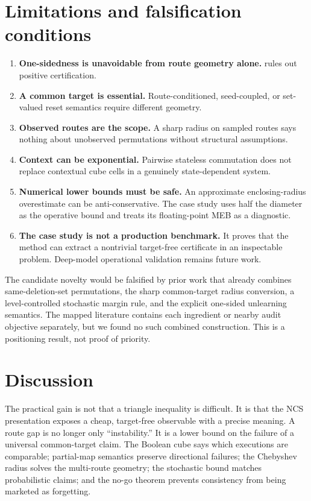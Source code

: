\documentclass[10pt]{article}
\theoremstyle{definition}
\theoremstyle{remark}
\begin{document}
\section{Limitations and falsification conditions}

\begin{enumerate}
  \item \textbf{One-sidedness is unavoidable from route geometry alone.}
   rules out positive certification.
  \item \textbf{A common target is essential.} Route-conditioned,
  seed-coupled, or set-valued reset semantics require different geometry.
  \item \textbf{Observed routes are the scope.} A sharp radius on sampled
  routes says nothing about unobserved permutations without structural
  assumptions.
  \item \textbf{Context can be exponential.} Pairwise stateless commutation
  does not replace contextual cube cells in a genuinely state-dependent
  system.
  \item \textbf{Numerical lower bounds must be safe.} An approximate
  enclosing-radius overestimate can be anti-conservative. The case study uses
  half the diameter as the operative bound and treats its floating-point MEB
  as a diagnostic.
  \item \textbf{The case study is not a production benchmark.} It proves that
  the method can extract a nontrivial target-free certificate in an inspectable
  problem. Deep-model operational validation remains future work.
\end{enumerate}

The candidate novelty would be falsified by prior work that already combines
same-deletion-set permutations, the sharp common-target radius conversion, a
level-controlled stochastic margin rule, and the explicit one-sided
unlearning semantics. The mapped literature contains each ingredient or
nearby audit objective separately, but we found no such combined construction.
This is a positioning result, not proof of priority.

\section{Discussion}

The practical gain is not that a triangle inequality is difficult. It is that
the NCS presentation exposes a cheap, target-free observable with a precise
meaning. A route gap is no longer only ``instability.'' It is a lower bound on
the failure of a universal common-target claim. The Boolean cube says which
executions are comparable; partial-map semantics preserve directional
failures; the Chebyshev radius solves the multi-route geometry; the stochastic
bound matches probabilistic claims; and the no-go theorem prevents consistency
from being marketed as forgetting.
\end{document}
